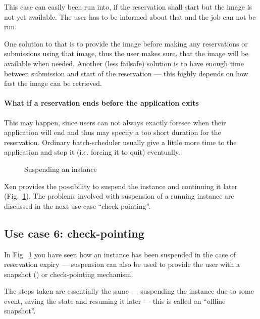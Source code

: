 This case can easily been run into, if the reservation shall start but the
image is not yet available. The user has to be informed about that and the
job can not be run.

One  solution  to  that  is   to  provide  the  image  before  making  any
reservations or  submissions using that  image, thus the user  makes sure,
that  the image  will be  available when  needed. Another  (less failsafe)
solution  is to  have  enough time  between  submission and  start of  the
reservation  ---  this  highly  depends  on  how fast  the  image  can  be
retrieved.

\paragraph{What if a reservation ends before the application exits}

This may  happen, since  users can not  always exactly foresee  when their
application will  end and thus  may specify a  too short duration  for the
reservation.  Ordinary batch-scheduler usually  give a little more time to
the application and stop it (i.e.  forcing it to quit) eventually.

\begin{figure}[htbp]
  \begin{center}
  \end{center}
  \caption{Suspending an instance}
  \label{fig:seq-advance-reservation-4}
\end{figure}

Xen provides  the possibility  to suspend the  instance and  continuing it
later  (Fig.~\ref{fig:seq-advance-reservation-4}).  The  problems involved
with suspension of  a running instance are discussed in  the next use case
``check-pointing''.


\subsection{Use case 6: check-pointing}

In Fig.~\ref{fig:seq-advance-reservation-4} you  have seen how an instance
has been  suspended in the case  of reservation expiry  --- suspension can
also    be    used    to    provide    the   user    with    a    snapshot
(\cite{distributed-snapshots}) or check-pointing mechanism.

The steps taken  are essentially the same ---  suspending the instance due
to some event,  saving the state and resuming it later  --- this is called
an ``offline snapshot''.

